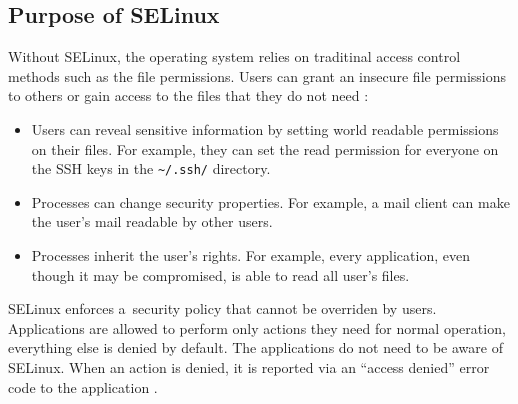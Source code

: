 \subsection{Purpose of SELinux}
Without SELinux, the operating system relies on traditinal access control
methods such as the file permissions. Users can grant an insecure file
permissions to others or gain access to the files that they do not need
\cite{selinuxguide}:
\begin{itemize}
    \item Users can reveal sensitive information by setting world readable
        permissions on their files. For example, they can set the read
        permission for everyone on the SSH keys in the
        \texttt{\textasciitilde/.ssh/} directory.
    \item Processes can change security properties. For example, a mail client
        can make the user's mail readable by other users.
    \item Processes inherit the user's rights. For example, every application,
        even though it may be compromised, is able to read all user's files.
\end{itemize}

SELinux enforces a~security policy that cannot be overriden by users.
Applications are allowed to perform only actions they need for normal operation,
everything else is denied by default. The applications do not need to be aware
of SELinux. When an action is denied, it is reported via an ``access denied''
error code to the application \cite{centoshowto}.

%
%    
%
%

